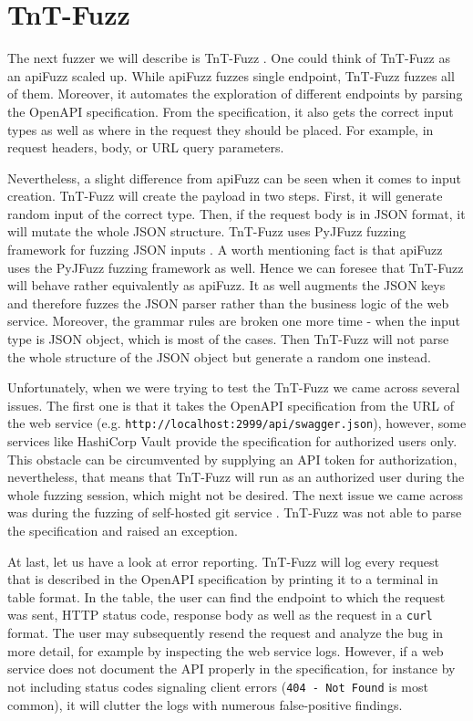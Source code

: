 \section{TnT-Fuzz}
\label{sec:tnt-fuzz}
The next fuzzer we will describe is TnT-Fuzz \cite{tntFuzzer2020github}. One could think of  TnT-Fuzz as an apiFuzz scaled up. While apiFuzz fuzzes single endpoint, TnT-Fuzz fuzzes all of them. Moreover, it automates the exploration of different endpoints by parsing the OpenAPI specification. From the specification, it also gets the correct input types as well as where in the request they should be placed. For example, in request headers, body, or URL query parameters.

Nevertheless, a slight difference from apiFuzz can be seen when it comes to input creation. TnT-Fuzz will create the payload in two steps. First, it will generate random input of the correct type. Then, if the request body is in JSON format, it will mutate the whole JSON structure. TnT-Fuzz uses PyJFuzz fuzzing framework for fuzzing JSON inputs \cite{pyjfuzz2020github}. A worth mentioning fact is that apiFuzz uses the PyJFuzz fuzzing framework as well. Hence we can foresee that TnT-Fuzz will behave rather equivalently as apiFuzz. It as well augments the JSON keys and therefore fuzzes the JSON parser rather than the business logic of the web service. Moreover, the grammar rules are broken one more time - when the input type is JSON object, which is most of the cases. Then TnT-Fuzz will not parse the whole structure of the JSON object but generate a random one instead.

Unfortunately, when we were trying to test the TnT-Fuzz we came across several issues. The first one is that it takes the OpenAPI specification from the URL of the web service (e.g. \texttt{http://localhost:2999/api/swagger.json}), however, some services like HashiCorp Vault \cite{vault2020github} provide the specification for authorized users only. This obstacle can be circumvented by supplying an API token for authorization, nevertheless, that means that TnT-Fuzz will run as an authorized user during the whole fuzzing session, which might not be desired. The next issue we came across was during the fuzzing of self-hosted git service \cite{gitea2020web}. TnT-Fuzz was not able to parse the specification and raised an exception.

At last, let us have a look at error reporting. TnT-Fuzz will log every request that is described in the OpenAPI specification by printing it to a terminal in table format. In the table, the user can find the endpoint to which the request was sent, HTTP status code, response body as well as the request in a \texttt{curl} format. The user may subsequently resend the request and analyze the bug in more detail, for example by inspecting the web service logs. However, if a web service does not document the API properly in the specification, for instance by not including status codes signaling client errors (\texttt{404 - Not Found} is most common), it will clutter the logs with numerous false-positive findings.


